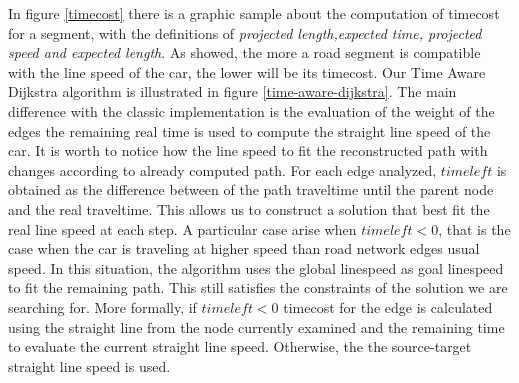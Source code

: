 \documentclass[5p]{elsarticle}
\begin{document}
In figure \ref{timecost} there is a graphic sample about the computation of timecost for a segment, with the definitions of \textit{projected length,expected time, projected speed and expected length}.
As showed, the more a road segment is compatible with the line speed of the car, the lower will be its timecost.  
Our Time Aware Dijkstra algorithm is illustrated in figure \ref{time-aware-dijkstra}. The main difference with the classic implementation is the evaluation of the weight of the edges  
the remaining real time is used to compute the straight line speed of the car. It is worth to notice how the line speed to fit the reconstructed path with changes according to already computed path. For each edge analyzed, $timeleft$ is obtained
as the difference between of the path traveltime until the parent node and the real traveltime. This allows us to construct a solution that best fit the real line speed at each step. A particular case arise when $timeleft<0$, that is the case
when the car is traveling at higher speed than road network edges usual speed. In this situation, the algorithm uses the global linespeed as goal linespeed to fit the remaining path. This still satisfies the constraints of the solution we are 
searching for. 
More formally, if $timeleft<0$ timecost for the edge is calculated using the straight line from the node currently examined and the remaining time to evaluate the current straight line speed. Otherwise, the the source-target 
straight line speed is used. 
 
\end{document}
